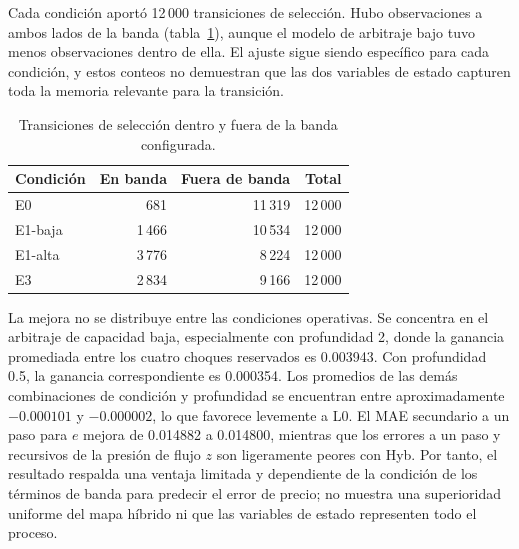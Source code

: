Cada condición aportó 12\,000 transiciones de selección. Hubo observaciones a ambos lados de la banda (tabla~\ref{tab:hybrid-regimes}), aunque el modelo de arbitraje bajo tuvo menos observaciones dentro de ella. El ajuste sigue siendo específico para cada condición, y estos conteos no demuestran que las dos variables de estado capturen toda la memoria relevante para la transición.

\begin{table}[htbp]
\centering
\caption{Transiciones de selección dentro y fuera de la banda configurada.}
\label{tab:hybrid-regimes}
\small
\begin{tabular}{@{}lrrr@{}}
\toprule
Condición & En banda & Fuera de banda & Total \\
\midrule
E0 & 681 & 11\,319 & 12\,000 \\
E1-baja & 1\,466 & 10\,534 & 12\,000 \\
E1-alta & 3\,776 & 8\,224 & 12\,000 \\
E3 & 2\,834 & 9\,166 & 12\,000 \\
\bottomrule
\end{tabular}
\end{table}

La mejora no se distribuye entre las condiciones operativas. Se concentra en el arbitraje de capacidad baja, especialmente con profundidad 2, donde la ganancia promediada entre los cuatro choques reservados es 0.003943. Con profundidad 0.5, la ganancia correspondiente es 0.000354. Los promedios de las demás combinaciones de condición y profundidad se encuentran entre aproximadamente $-0.000101$ y $-0.000002$, lo que favorece levemente a L0. El MAE secundario a un paso para $e$ mejora de 0.014882 a 0.014800, mientras que los errores a un paso y recursivos de la presión de flujo $z$ son ligeramente peores con Hyb. Por tanto, el resultado respalda una ventaja limitada y dependiente de la condición de los términos de banda para predecir el error de precio; no muestra una superioridad uniforme del mapa híbrido ni que las variables de estado representen todo el proceso.

